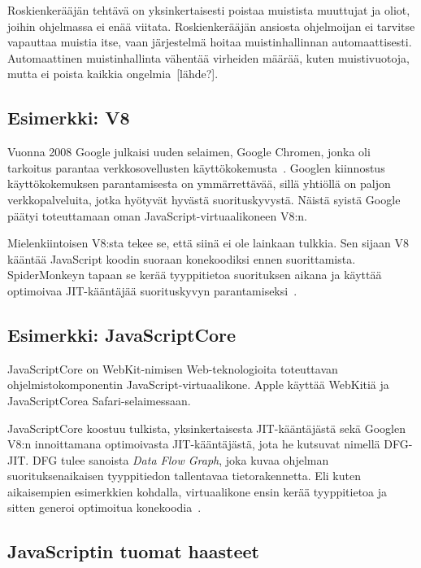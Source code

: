Roskienkerääjän tehtävä on yksinkertaisesti poistaa muistista muuttujat ja oliot, joihin ohjelmassa ei enää viitata. Roskienkerääjän ansiosta ohjelmoijan ei tarvitse vapauttaa muistia itse, vaan järjestelmä hoitaa muistinhallinnan automaattisesti. Automaattinen muistinhallinta vähentää virheiden määrää, kuten muistivuotoja, mutta ei poista kaikkia ongelmia~[lähde?].

\subsection{Esimerkki: V8}

Vuonna 2008 Google julkaisi uuden selaimen, Google Chromen, jonka oli tarkoitus parantaa verkkosovellusten käyttökokemusta~\cite{chromepress}. Googlen kiinnostus käyttökokemuksen parantamisesta on ymmärrettävää, sillä yhtiöllä on paljon verkkopalveluita, jotka hyötyvät hyvästä suorituskyvystä. Näistä syistä Google päätyi toteuttamaan oman JavaScript-virtuaalikoneen V8:n.

Mielenkiintoisen V8:sta tekee se, että siinä ei ole lainkaan tulkkia. Sen sijaan V8 kääntää JavaScript koodin suoraan konekoodiksi ennen suorittamista. SpiderMonkeyn tapaan se kerää tyyppitietoa suorituksen aikana ja käyttää optimoivaa JIT-kääntäjää suorituskyvyn parantamiseksi~\cite{v8compilers}.


\subsection{Esimerkki: JavaScriptCore}

JavaScriptCore on WebKit-nimisen Web-teknologioita toteuttavan ohjelmistokomponentin JavaScript-virtuaalikone. Apple käyttää WebKitiä ja \mbox{JavaScriptCorea} Safari-selaimessaan.

JavaScriptCore koostuu tulkista, yksinkertaisesta JIT-kääntäjästä sekä Googlen V8:n innoittamana optimoivasta JIT-kääntäjästä, jota he kutsuvat nimellä DFG-JIT. DFG tulee sanoista \textit{Data Flow Graph}, joka kuvaa ohjelman suorituksenaikaisen tyyppitiedon tallentavaa tietorakennetta. Eli kuten aikaisempien esimerkkien kohdalla, virtuaalikone ensin kerää tyyppitietoa ja sitten generoi optimoitua konekoodia~\cite{javascriptcore}.

\subsection{JavaScriptin tuomat haasteet}

